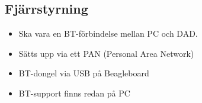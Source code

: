 	\begin{figure}[h]
	\centerline{}
	\caption{}
	\end{figure}
	\pagebreak	
	
	\subsection{Fjärrstyrning}
	\begin{itemize}
		\item Ska vara en BT-förbindelse mellan PC och DAD.
		\item Sätts upp via ett PAN (Personal Area Network)
		\item BT-dongel via USB på Beagleboard
		\item BT-support finns redan på PC
	\end{itemize}
%